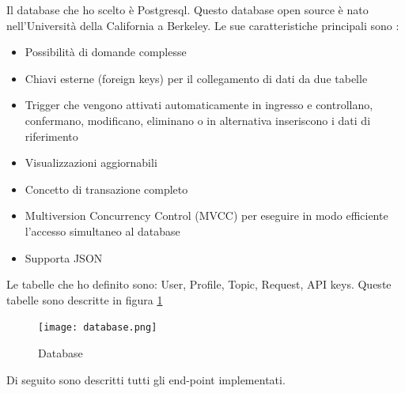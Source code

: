 Il database che ho scelto è Postgresql. Questo database open source è nato nell'Università della California a Berkeley. Le sue caratteristiche principali sono \cite{ionosPostgres}:
\begin{itemize}
    \item Possibilità di domande complesse
    \item Chiavi esterne (foreign keys) per il collegamento di dati da due tabelle
    \item Trigger che vengono attivati automaticamente in ingresso e controllano, confermano, modificano, eliminano o in alternativa inseriscono i dati di riferimento
    \item Visualizzazioni aggiornabili
    \item Concetto di transazione completo
    \item Multiversion Concurrency Control (MVCC) per eseguire in modo efficiente l’accesso simultaneo al database
    \item Supporta JSON
\end{itemize}

Le tabelle che ho definito sono: User, Profile, Topic, Request, API keys. 
Queste tabelle sono descritte in figura \ref{fig:database}
\begin{figure}
\begin{center}
  \texttt{[image: database.png]}%
  \caption{Database}
  \label{fig:database}
\end{center}
\end{figure}
Di seguito sono descritti tutti gli end-point implementati.

